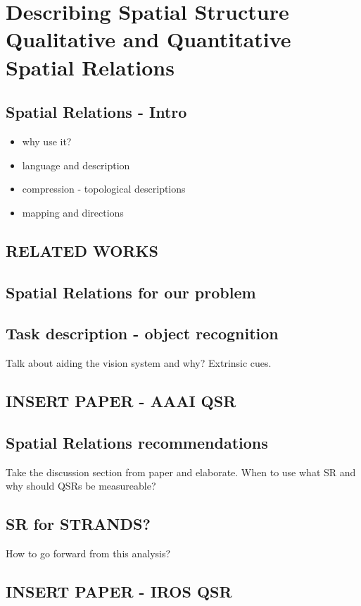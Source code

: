 \chapter{Describing Spatial Structure \\ {\Large Qualitative and Quantitative Spatial Relations}}
\label{chap:QSRs}

\section{Spatial Relations - Intro}
\begin{itemize}
\item why use it?
\item language and description
\item compression - topological descriptions
\item mapping and directions
\end{itemize}
\section{RELATED WORKS}
\section{Spatial Relations for our problem}
\section{Task description - object recognition}
Talk about aiding the vision system and why? Extrinsic cues.
\section{INSERT PAPER - AAAI QSR}
\section{Spatial Relations recommendations}
Take the discussion section from paper and elaborate. When to use what SR and why should QSRs be measureable?
\section{SR for STRANDS?}
How to go forward from this analysis?
\section{INSERT PAPER - IROS QSR}
